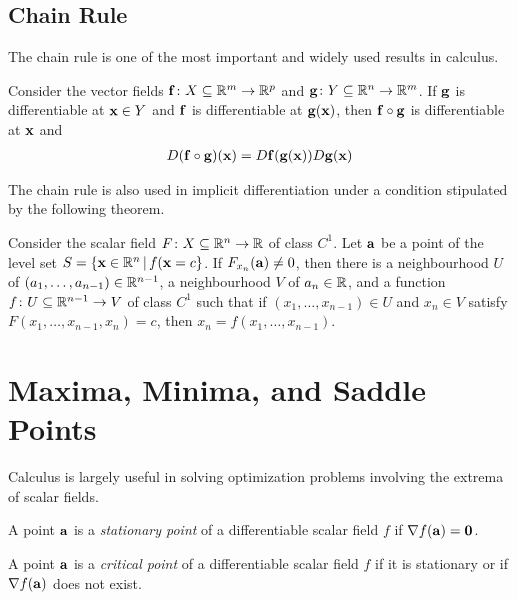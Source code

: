 \documentclass{article}
\begin{document}
\subsection{Chain Rule}

The chain rule is one of the most important and widely used results in calculus.

\begin{theorem}
  Consider the vector fields $\mathbf{f} \colon X \subseteq \mathbb{R}^m \to \mathbb{R}^p$ and $\mathbf{g} \colon Y \subseteq \mathbb{R}^n \to \mathbb{R}^m$.
  If $\mathbf{g}$ is differentiable at $\mathbf{x} \in Y$ and $\mathbf{f}$ is differentiable at $\mathbf{g}(\mathbf{x})$, then $\mathbf{f} \circ \mathbf{g}$ is differentiable at $\mathbf{x}$ and
  \begin{align}
    D(\mathbf{f} \circ \mathbf{g})(\mathbf{x}) = D\mathbf{f}(\mathbf{g}(\mathbf{x})) D\mathbf{g}(\mathbf{x})
  \end{align}
\end{theorem}
The chain rule is also used in implicit differentiation under a condition stipulated by the following theorem.

\begin{theorem}
  Consider the scalar field $F \colon X \subseteq \mathbb{R}^n \to \mathbb{R}$ of class $C^1$.
  Let $\mathbf{a}$ be a point of the level set $S = \{\mathbf{x} \in \mathbb{R}^n \,|\, f(\mathbf{x} = c\}$.
  If $F_{x_n}(\mathbf{a}) \neq 0$, then there is a neighbourhood $U$ of $(a_1, \ldots, a_{n - 1}) \in \mathbb{R}^{n - 1}$, a neighbourhood $V$ of $a_n \in \mathbb{R}$, and a function $f \colon U \subseteq \mathbb{R}^{n - 1} \to V$ of class $C^1$ such that if $(x_1, \ldots, x_{n - 1}) \in U$ and $x_n \in V$ satisfy $F(x_1, \ldots, x_{n - 1}, x_n) = c$, then $x_n = f(x_1, \ldots, x_{n - 1})$.
\end{theorem}

\section{Maxima, Minima, and Saddle Points}

Calculus is largely useful in solving optimization problems involving the extrema of scalar fields.

\begin{definition}
  A point $\mathbf{a}$ is a \emph{stationary point} of a differentiable scalar field $f$ if $\nabla f(\mathbf{a}) = \mathbf{0}$.
\end{definition}

\begin{definition}
  A point $\mathbf{a}$ is a \emph{critical point} of a differentiable scalar field $f$ if it is stationary or if $\nabla f(\mathbf{a})$ does not exist.
\end{definition}
\end{document}
